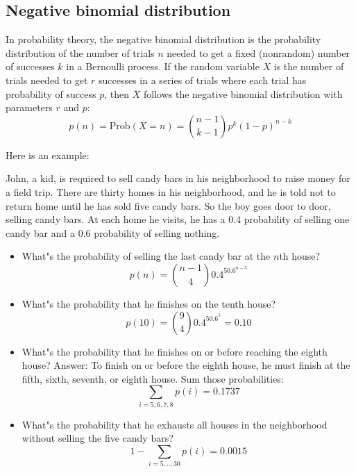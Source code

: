 \documentclass[justified, sixbynine]{tufte-book}
\theoremstyle{plain}%
\newtheorem * {corollary}{Corollary}
\theoremstyle{definition}
\theoremstyle{remark}
\newtheorem * {remark}{Remark}
\newtheorem * {note}{Note}
\begin{document}
\begin{fullwidth}
\goodbreak\subsection{Negative binomial distribution}

In probability theory, the negative binomial distribution is the probability
distribution of the number of trials $n$ needed to get a fixed
(nonrandom) number of successes $k$ in a Bernoulli process. If the random
variable $X$ is the number of trials needed to get $r$ successes in a series of
trials where each trial has probability of success $p$, then $X$ follows the
negative binomial distribution with parameters $r$ and $p$:
\begin{equation}
p(n)=\textrm{Prob}(X=n)=\binom{n-1}{k-1}p^k(1-p)^{n-k}
\end{equation}

Here is an example:

John, a kid, is required to sell candy bars in his neighborhood to
raise money for a field trip. There are thirty homes in his
neighborhood, and he is told not to return home until he has sold five candy bars.
So the boy goes door to door, selling candy bars. At each home he visits, he
has a 0.4 probability of selling one candy bar and a 0.6 probability of
selling nothing.

\begin{itemize}
\item  What"s the probability of selling the last candy bar at the $n$th house?
\begin{equation}
p(n)=\binom{n-1}40.4^50.6^{n-5}
\end{equation}

\item  What"s the probability that he finishes on the tenth house?
\begin{equation}
p(10)=\binom 940.4^50.6^5=0.10
\end{equation}

\item  What"s the probability that he finishes on or before reaching the
eighth house? Answer: To finish on or before the eighth house, he must
finish at the fifth, sixth, seventh, or eighth house. Sum those
probabilities:
\begin{equation}
\sum_{i=5, 6, 7, 8}p(i)=0.1737
\end{equation}

\item  What"s the probability that he exhausts all houses in the
neighborhood without selling the five candy bars?
\begin{equation}
1-\sum_{i=5, .., 30}p(i)=0.0015
\end{equation}
\end{itemize}


\end{fullwidth}
\end{document}
